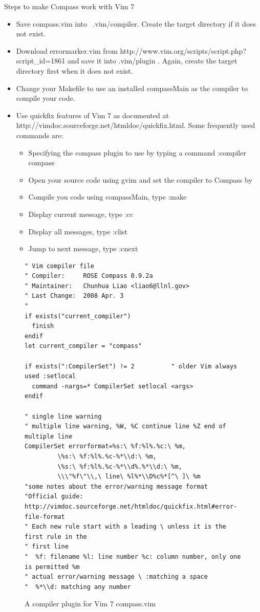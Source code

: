 Steps to make Compass work with Vim 7
\begin{itemize}
\item Save compass.vim into ~.vim/compiler.  Create the target directory if it
does not exist.
\item Download errormarker.vim from
http://www.vim.org/scripts/script.php?script\_id=1861 and save it
into .vim/plugin . Again, create the target directory first when it does not
exist.
\item Change your Makefile to use an installed compassMain as the compiler
to compile your code.
\item Use quickfix features of Vim 7 as documented at
http://vimdoc.sourceforge.net/htmldoc/quickfix.html. Some frequently used
commands are:
  \begin{itemize}
   \item Specifying the compass plugin to use by typing a command :compiler compass
   \item Open your source code using gvim and set the compiler to Compass by
   \item Compile you code using compassMain, type :make
   \item Display current message, type :cc
   \item Display all messages, type :clist
   \item Jump to next message, type :cnext
  \end{itemize}
\end{itemize}
\begin{figure}[!htp]
{\scriptsize
\begin{verbatim}
" Vim compiler file
" Compiler:     ROSE Compass 0.9.2a
" Maintainer:   Chunhua Liao <liao6@llnl.gov>
" Last Change:  2008 Apr. 3
"
if exists("current_compiler")
  finish
endif
let current_compiler = "compass"

if exists(":CompilerSet") != 2          " older Vim always used :setlocal
  command -nargs=* CompilerSet setlocal <args>
endif

" single line warning
" multiple line warning, %W, %C continue line %Z end of multiple line
CompilerSet errorformat=%s:\ %f:%l%.%c:\ %m,
         \%s:\ %f:%l%.%c-%*\\d:\ %m,
         \%s:\ %f:%l%.%c-%*\\d%.%*\\d:\ %m,
         \\\"%f\"\\,\ line\ %l%*\\D%c%*[^\ ]\ %m
"some notes about the error/warning message format
"Official guide: http://vimdoc.sourceforge.net/htmldoc/quickfix.html#error-file-format
" Each new rule start with a leading \ unless it is the first rule in the
" first line
"  %f: filename %l: line number %c: column number, only one is permitted %m
" actual error/warning message \ :matching a space
"  %*\\d: matching any number

\end{verbatim}
}
\caption{A compiler plugin for Vim 7 compass.vim}
\label{compassVim7}
\end{figure}
